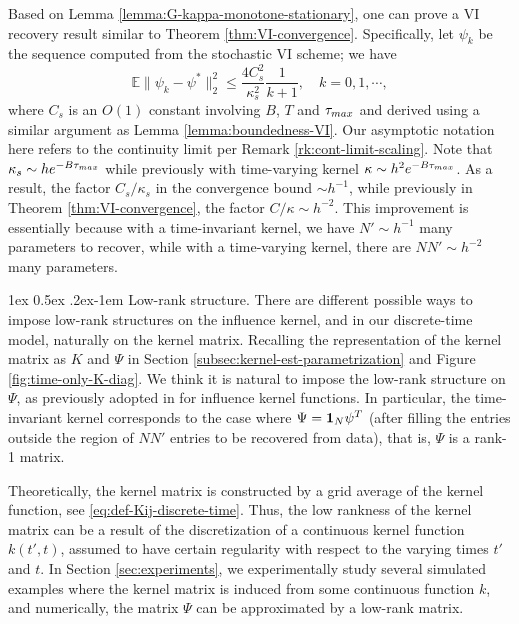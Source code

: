 \documentclass[11pt]{article}
\makeatletter
\theoremstyle{remark}
\theoremstyle{plain}
\newcommand{\E}{\mathbb{E}}
\renewcommand{\paragraph}{%
  \@startsection{paragraph}{4}%
  {\z@}{1ex \@plus 0.5ex \@minus .2ex}{-1em}%
  {\normalfont\normalsize\itshape}%
}
\makeatother
\begin{document}
Based on Lemma \ref{lemma:G-kappa-monotone-stationary}, one can prove a VI recovery result similar to Theorem \ref{thm:VI-convergence}. Specifically, let $\psi_k$ be the sequence computed from the stochastic VI scheme; we have
\[
\E \| \psi_k - \psi^*\|_2^2 \le \frac{4C_s^2}{ \kappa_s^2} \frac{1}{k+1}, \quad k = 0, 1, \cdots,
\]
where $C_s$ is an $O(1)$ constant involving $B$, $T$ and $\tau_{\rm max}$ and derived using a similar argument as Lemma \ref{lemma:boundedness-VI}. Our asymptotic notation here refers to the continuity limit per Remark \ref{rk:cont-limit-scaling}. 
Note that $\kappa_s \sim h e^{-B \tau_{\rm max}}$ while previously with time-varying kernel $\kappa \sim h^2 e^{-B \tau_{\rm max}}$.
As a result, the factor $C_s/\kappa_s$ in the convergence bound $\sim h^{-1}$, while previously in Theorem \ref{thm:VI-convergence}, the factor $C/\kappa \sim h^{-2}$.  
This improvement is essentially because with a time-invariant kernel, we have $N' \sim h^{-1}$  many parameters to recover, while with a time-varying kernel, there are $N N' \sim h^{-2}$ many parameters.



\paragraph{Low-rank structure.}
There are different possible ways to impose low-rank structures on the influence kernel, 
and in our discrete-time model, naturally on the kernel matrix. Recalling the representation of the kernel matrix as $K$ and $\Psi$ in Section \ref{subsec:kernel-est-parametrization} and Figure \ref{fig:time-only-K-diag}.
%
We think it is natural to impose the low-rank structure on $\Psi$, as previously adopted in \cite{dong2022spatio} for influence kernel functions. 
In particular, the time-invariant kernel corresponds to the case where
$\Psi = {\bf 1}_N \psi^T$ (after filling the entries outside the region of $NN'$ entries to be recovered from data),
that is, $\Psi$ is a rank-1 matrix.


Theoretically, the kernel matrix is constructed by a grid average of the kernel function, see \eqref{eq:def-Kij-discrete-time}. Thus, the low rankness of the kernel matrix can be a result of the discretization of a continuous kernel function $k(t',t)$, assumed to have certain regularity with respect to the varying times $t'$ and $t$. 
In Section \ref{sec:experiments}, we experimentally study several simulated examples where the kernel matrix is induced from some continuous function $k$, and numerically, the matrix $\Psi$ can be approximated by a low-rank matrix.
\end{document}
